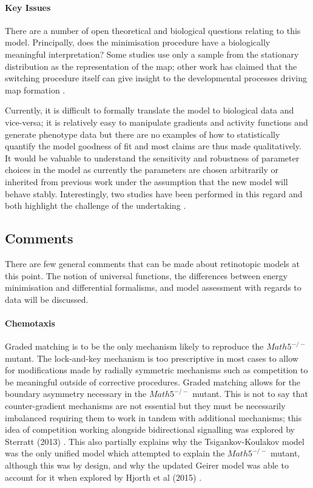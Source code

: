 \paragraph{Key Issues}
There are a number of open theoretical and biological questions relating to this model. Principally, does the minimisation procedure have a biologically meaningful interpretation? Some studies use only a sample from the stationary distribution as the representation of the map; other work has claimed that the switching procedure itself can give insight to the developmental processes driving map formation \cite{Lyngholm2019-fs}.

Currently, it is difficult to formally translate the model to biological data and vice-versa; it is relatively easy to manipulate gradients and activity functions and generate phenotype data but there are no examples of how to statistically quantify the model goodness of fit and most claims are thus made qualitatively. It would be valuable to understand the sensitivity and robustness of parameter choices in the model as currently the parameters are chosen arbitrarily or inherited from previous work under the assumption that the new model will behave stably. Interestingly, two studies have been performed in this regard and both highlight the challenge of the undertaking \cite{Tikidji-Hamburyan2016-sn}.
\subsection{Comments}
There are few general comments that can be made about retinotopic models at this point. The notion of universal functions, the differences between energy minimisation and differential formalisms, and model assessment with regards to data will be discussed.
\paragraph{Chemotaxis}
Graded matching is to be the only mechanism likely to reproduce the $Math5^{-/-}$ mutant. The lock-and-key mechanism is too prescriptive in most cases to allow for modifications made by radially symmetric mechanisms such as competition to be meaningful outside of corrective procedures. Graded matching allows for the boundary asymmetry necessary in the $Math5^{-/-}$ mutant. This is not to say that counter-gradient mechanisms are not essential but they must be necessarily imbalanced requiring them to work in tandem with additional mechanisms; this idea of competition working alongside bidirectional signalling was explored by Sterratt (2013) \cite{Sterratt2013-ev}. This also partially explains why the Tsigankov-Koulakov model was the only unified model which attempted to explain the $Math5^{-/-}$ mutant, although this was by design, and why the updated Geirer model was able to account for it when explored by Hjorth et al (2015) \cite{Hjorth2015-le}.
